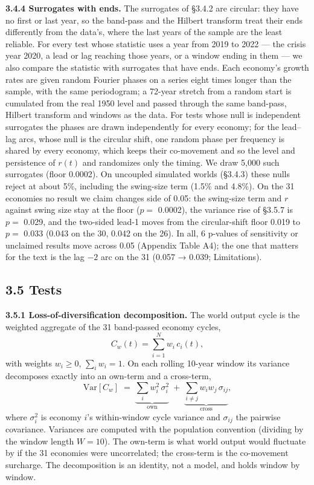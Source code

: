 \documentclass[11pt,a4paper]{article}
\begin{document}
\textbf{3.4.4 Surrogates with ends.} The surrogates of §3.4.2 are circular: they have no first or last year, so the band-pass and the Hilbert transform treat their ends differently from the data's, where the last years of the sample are the least reliable. For every test whose statistic uses a year from 2019 to 2022 — the crisis year 2020, a lead or lag reaching those years, or a window ending in them — we also compare the statistic with surrogates that have ends. Each economy's growth rates are given random Fourier phases on a series eight times longer than the sample, with the same periodogram; a 72-year stretch from a random start is cumulated from the real 1950 level and passed through the same band-pass, Hilbert transform and windows as the data. For tests whose null is independent surrogates the phases are drawn independently for every economy; for the lead–lag arcs, whose null is the circular shift, one random phase per frequency is shared by every economy, which keeps their co-movement and so the level and persistence of \(r(t)\) and randomizes only the timing. We draw 5,000 such surrogates (floor 0.0002). On uncoupled simulated worlds (§3.4.3) these nulls reject at about 5\%, including the swing-size term (1.5\% and 4.8\%). On the 31 economies no result we claim changes side of 0.05: the swing-size term and \(r\) against swing size stay at the floor (\(p =\) 0.0002), the variance rise of §3.5.7 is \(p =\) 0.029, and the two-sided lead-1 moves from the circular-shift floor 0.019 to \(p =\) 0.033 (0.043 on the 30, 0.042 on the 26). In all, 6 p-values of sensitivity or unclaimed results move across 0.05 (Appendix Table A4); the one that matters for the text is the lag \(-2\) arc on the 31 (0.057 → 0.039; Limitations).

\subsection{3.5 Tests}\label{tests}

\textbf{3.5.1 Loss-of-diversification decomposition.} The world output cycle is the weighted aggregate of the 31 band-passed economy cycles, \[C_w(t) = \sum_{i=1}^{N} w_i\, c_i(t),\] with weights \(w_i \ge 0\), \(\sum_i w_i = 1\). On each rolling 10-year window its variance decomposes exactly into an own-term and a cross-term, \[\mathrm{Var}[C_w] \;=\; \underbrace{\sum_{i} w_i^2\, \sigma_i^2}_{\text{own}} \;+\; \underbrace{\sum_{i \ne j} w_i w_j\, \sigma_{ij}}_{\text{cross}},\] where \(\sigma_i^2\) is economy \(i\)'s within-window cycle variance and \(\sigma_{ij}\) the pairwise covariance. Variances are computed with the population convention (dividing by the window length \(W = 10\)). The own-term is what world output would fluctuate by if the 31 economies were uncorrelated; the cross-term is the co-movement surcharge. The decomposition is an identity, not a model, and holds window by window.
\end{document}
